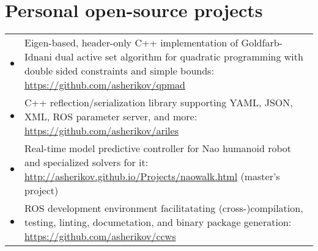\documentclass[a4paper,10pt]{report}
\begin{document}
\section{Personal open-source projects}
\begin{adjustwidth}{0.5cm}{0pt}
    \begin{tabularx}{\linewidth}{l X}
        \hfill $\bullet$    &   Eigen-based, header-only C++ implementation of Goldfarb-Idnani dual active set
                                algorithm for quadratic programming with double sided constraints and simple bounds:
                                \href{https://github.com/asherikov/qpmad}{https://github.com/asherikov/qpmad}\\

        \hfill $\bullet$    &   C++ reflection/serialization library supporting
                                YAML, JSON, XML, ROS parameter server, and more:
                                \href{https://github.com/asherikov/ariles}{https://github.com/asherikov/ariles}\\

        \hfill $\bullet$    &   Real-time model predictive controller for Nao
                                humanoid robot and specialized solvers for it:
                                \href{http://asherikov.github.io/Projects/naowalk.html}
                                {http://asherikov.github.io/Projects/naowalk.html} (master's project) \\

        \hfill $\bullet$    &   ROS development environment facilitatating (cross-)compilation,
                                testing, linting, documetation, and binary package generation:
                                \href{https://github.com/asherikov/ccws}
                                {https://github.com/asherikov/ccws}
    \end{tabularx}
\end{adjustwidth}


\vspace{0.2cm}
\end{document}
